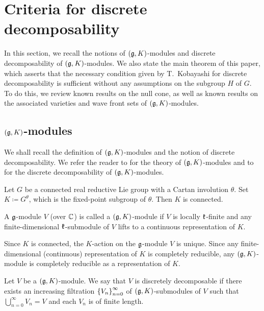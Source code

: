 
\section{Criteria for discrete decomposability} \label{section:Criteria}

In this section, we recall the notions of $(\mathfrak{g}, K)$-modules and discrete decomposability of $(\mathfrak{g}, K)$-modules.
We also state the main theorem of this paper, which asserts that the necessary condition given by T.\ Kobayashi for discrete decomposability is sufficient without any assumptions on the subgroup $H$ of $G$.
To do this, we review known results on the null cone, as well as known results on the associated varieties and wave front sets of $(\mathfrak{g}, K)$-modules.

\subsection{\texorpdfstring{$(\mathfrak{g}, K)$}{(g,K)}-modules}

We shall recall the definition of $(\mathfrak{g}, K)$-modules and the notion of discrete decomposability.
We refer the reader to \cite{Wa88_real_reductive_I} for the theory of $(\mathfrak{g}, K)$-modules and to \cite{Ko98_discrete_decomposable_3} for the discrete decomposability of $(\mathfrak{g}, K)$-modules.

Let $G$ be a connected real reductive Lie group with a Cartan involution $\theta$.
Set $K\coloneq G^\theta$, which is the fixed-point subgroup of $\theta$.
Then $K$ is connected.

\begin{definition}
	A $\mathfrak{g}$-module $V$ (over $\mathbb{C}$) is called a $(\mathfrak{g}, K)$-module if $V$ is locally $\mathfrak{k}$-finite and any finite-dimensional $\mathfrak{k}$-submodule of $V$ lifts to a continuous representation of $K$.
\end{definition}

Since $K$ is connected, the $K$-action on the $\mathfrak{g}$-module $V$ is unique.
Since any finite-dimensional (continuous) representation of $K$ is completely reducible, any $(\mathfrak{g}, K)$-module is completely reducible as a representation of $K$.

\begin{definition} \label{def:DiscretelyDecomposable}
	Let $V$ be a $(\mathfrak{g}, K)$-module.
	We say that $V$ is discretely decomposable if there exists an increasing filtration $\left\{V_n \right\}_{n=0}^\infty$ of $(\mathfrak{g}, K)$-submodules of $V$ such that $\bigcup_{n=0}^\infty V_n = V$ and each $V_n$ is of finite length.
\end{definition}

